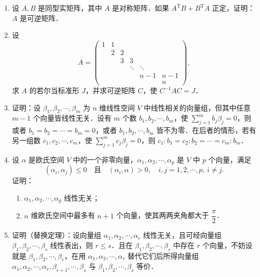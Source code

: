 \begin{enumerate}
  \ansproof
  \item 设 $A,B$ 是同型实矩阵，其中 $A$ 是对称矩阵．如果 $A^{\mathrm{T}}B+B^{\mathrm{T}}A$ 正定，证明：$A$ 是可逆矩阵．

  \ansproof
  \item 设
  \[
    A=\begin{pmatrix}
      1 & 1 & & & & \\
       & 2 & 2 & & & \\
       & & 3 & 3 & & \\
       & & & \ddots & \ddots & \\
       & & & & n-1 & n-1\\
       & & & & & n
    \end{pmatrix},
  \]
  求 $A$ 的若尔当标准形 $J$，并求可逆矩阵 $C$，使 $C^{-1}AC=J$．

  \anscompute
  \item 证明：设 $\beta_1,\beta_2,\cdots,\beta_m$ 为 $n$ 维线性空间 $V$ 中线性相关的向量组，但其中任意 $m-1$ 个向量皆线性无关．设有 $m$ 个数 $b_1,b_2,\cdots,b_m$，使 $\sum\limits_{j=1}^m b_j\beta_j=0$，则或者 $b_1=b_2=\cdots=b_m=0$，或者 $b_1,b_2,\cdots,b_m$ 皆不为零．在后者的情形，若有另一组数 $c_1,c_2,\cdots,c_m$，使 $\sum\limits_{j=1}^m c_j\beta_j=0$，则 $c_1:b_1=c_2:b_2=\cdots=c_m:b_m$．

  \ansproof
  \item 设 $\alpha$ 是欧氏空间 $V$ 中的一个非零向量，$\alpha_1,\alpha_2,\cdots,\alpha_p$ 是 $V$ 中 $p$ 个向量，满足
  \[
    (\alpha_i,\alpha_j)\leq 0\quad\text{且}\quad (\alpha_i,\alpha)>0,\quad i,j=1,2,\cdots,p,\ i\neq j.
  \]
  证明：
  \begin{enumerate}
    \item $\alpha_1,\alpha_2,\cdots,\alpha_p$ 线性无关；
  \anssub
    \item $n$ 维欧氏空间中最多有 $n+1$ 个向量，使其两两夹角都大于 $\dfrac{\pi}{2}$．
  \anssub
  \end{enumerate}

  \item 证明（替换定理）：设向量组 $\alpha_1,\allowbreak \alpha_2,\allowbreak \cdots,\allowbreak \alpha_r$ 线性无关，且可经向量组 $\beta_1,\allowbreak \beta_2,\allowbreak \cdots,\allowbreak \beta_s$ 线性表出，则 $r\leq s$．且在 $\beta_1,\allowbreak \beta_2,\allowbreak \cdots,\allowbreak \beta_s$ 中存在 $r$ 个向量，不妨设就是 $\beta_1,\allowbreak \beta_2,\allowbreak \cdots,\allowbreak \beta_r$，在用 $\alpha_1,\allowbreak \alpha_2,\allowbreak \cdots,\allowbreak \alpha_r$ 替代它们后所得向量组 $\alpha_1,\allowbreak \alpha_2,\allowbreak \cdots,\allowbreak \alpha_r,\allowbreak \beta_{r+1},\allowbreak \cdots,\allowbreak \beta_s$ 与 $\beta_1,\allowbreak \beta_2,\allowbreak \cdots,\allowbreak \beta_s$ 等价．


\end{enumerate}
